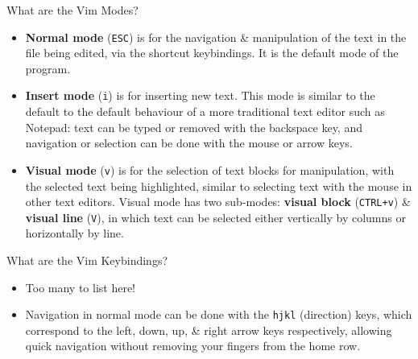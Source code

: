 \documentclass[]{beamer}
\begin{document}
\begin{frame}{What are the Vim Modes?}
    \begin{itemize}
        \item   \textbf{Normal mode} (\texttt{ESC}) is for the navigation \& manipulation of the text in the file
                being edited, via the shortcut keybindings.
                It is the default mode of the program.
        \item   \textbf{Insert mode} (\texttt{i}) is for inserting new text. This mode is similar to the
                default to the default behaviour of a more traditional text editor such as Notepad: text can be typed
                or removed with the backspace key, and navigation or selection can be done with the mouse or arrow
                keys.
        \item   \textbf{Visual mode} (\texttt{v}) is for the selection of text blocks for manipulation, with the
                selected text being highlighted, similar to selecting text with the mouse in other text editors.
                Visual mode has two sub-modes: \textbf{visual block} (\texttt{CTRL+v}) \& \textbf{visual line}
                (\texttt{V}), in which text can be selected either vertically by columns or horizontally by line.
    \end{itemize}
\end{frame}

\begin{frame}{What are the Vim Keybindings?}
    \begin{itemize}
        \item   Too many to list here!
        \item   Navigation in normal mode can be done with the \texttt{hjkl} (direction) keys, which correspond to
                the left, down, up, \& right arrow keys respectively, allowing quick navigation without removing your
                fingers from the home row.
    \end{itemize}
\end{frame}
\end{document}
